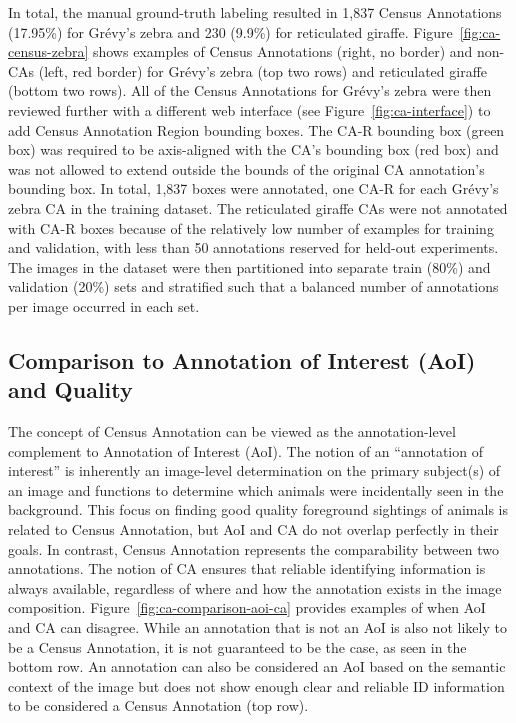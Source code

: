 In total, the manual ground-truth labeling resulted in 1,837 Census Annotations (17.95\%) for Gr\'evy's zebra and 230 (9.9\%) for reticulated giraffe.  Figure~\ref{fig:ca-census-zebra} shows examples of Census Annotations (right, no border) and non-CAs (left, red border) for Gr\'evy's zebra (top two rows) and reticulated giraffe (bottom two rows).  All of the Census Annotations for Gr\'evy's zebra were then reviewed further with a different web interface (see Figure~\ref{fig:ca-interface}) to add Census Annotation Region bounding boxes.  The CA-R bounding box (green box) was required to be axis-aligned with the CA's bounding box (red box) and was not allowed to extend outside the bounds of the original CA annotation's bounding box.  In total, 1,837 boxes were annotated, one CA-R for each Gr\'evy's zebra CA in the training dataset.  The reticulated giraffe CAs were not annotated with CA-R boxes because of the relatively low number of examples for training and validation, with less than 50 annotations reserved for held-out experiments.  The images in the dataset were then partitioned into separate train (80\%) and validation (20\%) sets and stratified such that a balanced number of annotations per image occurred in each set.

\subsection{Comparison to Annotation of Interest (AoI) and Quality} \label{sec:ca-aoi-compare}

The concept of Census Annotation can be viewed as the annotation-level complement to Annotation of Interest (AoI).  The notion of an ``annotation of interest'' is inherently an image-level determination on the primary subject(s) of an image and functions to determine which animals were incidentally seen in the background.  This focus on finding good quality foreground sightings of animals is related to Census Annotation, but AoI and CA do not overlap perfectly in their goals.  In contrast, Census Annotation represents the comparability between two annotations.  The notion of CA ensures that reliable identifying information is always available, regardless of where and how the annotation exists in the image composition.  Figure~\ref{fig:ca-comparison-aoi-ca} provides examples of when AoI and CA can disagree.  While an annotation that is not an AoI is also not likely to be a Census Annotation, it is not guaranteed to be the case, as seen in the bottom row.  An annotation can also be considered an AoI based on the semantic context of the image but does not show enough clear and reliable ID information to be considered a Census Annotation (top row).

